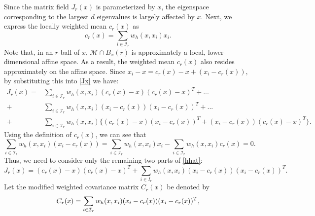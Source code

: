 \documentclass[aos,preprint]{imsart}
\theoremstyle{remark}
\begin{document}
Since the matrix field $J_r(x)$ is parameterized by $x$, the eigenspace corresponding to the largest $d$ eigenvalues is largely affected by $x$. Next, we express the locally weighted mean $c_r(x)$ as
 \begin{equation}\label{c_r_x}
 c_r(x) =  \sum_{i\in {\mathcal I}_r }w_h(x, x_i) x_i.
 \end{equation}
%
Note that, in an $r$-ball of $x$, ${\mathcal M} \cap B_x(r)$ is approximately a local, lower-dimensional affine space. As a result, the weighted mean $c_r(x)$ also resides approximately on the affine space.
Since $x_i -x = c_r(x) -x + (x_i - c_r(x))$, by substituting this into \eqref{Jx} we have:
\begin{equation}\label{hhat}
\begin{aligned}
J_r(x) =& \sum_{i\in {\mathcal I}_r} w_h(x, x_i) (c_r(x) - x)(c_r(x)-x)^T +...\\
+& \sum_{i\in {\mathcal I}_r} w_h(x, x_i) (x_i-c_r(x)) (x_i-c_r(x))^T+...\\
+&\sum_{i\in {\mathcal I}_r } w_h(x, x_i)\{(c_r(x)-x) (x_i-c_r(x))^T+ (x_i-c_r(x))(c_r(x)-x)^T\}.
\end{aligned}
\end{equation}
Using the definition of $c_r(x)$, we can see that
\[
\sum_{i\in {\mathcal I}_r} w_h(x, x_i) (x_i -c_r(x)) = \sum_{i\in {\mathcal I}_r} w_h(x, x_i) x_i -\sum_{i\in {\mathcal I}_r} w_h(x, x_i) c_r(x) = 0.
\]
Thus, we need to consider only the remaining two parts of \eqref{hhat}:
\begin{equation}\label{Hw}
J_r(x) = (c_r(x) - x)(c_r(x)-x)^T + \sum_{i\in I_r} w_h(x, x_i) (x_i-c_r(x)) (x_i-c_r(x))^T.
\end{equation}
Let the modified weighted covariance matrix $C_r(x)$ be denoted by
\[
C_r(x) = \sum_{i\in {\cal I}_r} w_h(x, x_i) (x_i-c_r(x)) (x_i-c_r(x))^T,
\]
\end{document}
